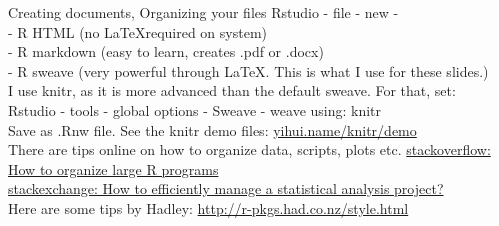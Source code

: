 \documentclass[xcolor=table,           xcolor=dvipsnames]{beamer}\usepackage[]{graphicx}\usepackage[]{color}
\begin{document}

\begin{frame}{Creating documents, Organizing your files}
\label{rnw}
Rstudio - file - new -\\
- R HTML (no \LaTeX required on system)\\
- R markdown (easy to learn, creates .pdf or .docx)\\
- R sweave (very powerful through \LaTeX. This is what I use for these slides.)\\[1em]
\pause
I use knitr, as it is more advanced than the default sweave. For that, set:\\
Rstudio - tools - global options - Sweave - weave using: knitr\\
Save as .Rnw file. See the knitr demo files: \href{http://yihui.name/knitr/demo/minimal/}{yihui.name/knitr/demo}\\[1em]
\pause
There are tips online on how to organize data, scripts, plots etc.
\href{http://stackoverflow.com/questions/1266279/how-to-organize-large-r-programs}{stackoverflow: How to organize large R programs}\\
\href{http://stats.stackexchange.com/questions/2910/how-to-efficiently-manage-a-statistical-analysis-project}
{stackexchange: How to efficiently manage a statistical analysis project?}\\
Here are some tips by Hadley:
\href{http://r-pkgs.had.co.nz/style.html}{http://r-pkgs.had.co.nz/style.html}
\end{frame}


\end{document}
